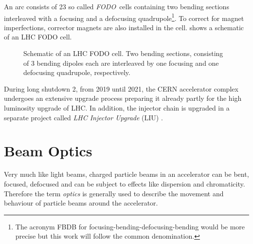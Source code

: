 An arc consists of 23 so called \emph{FODO}~cells containing two bending sections interleaved with
a focusing and a defocusing quadrupole\footnote{
    The acronym FBDB for focusing-bending-defocusing-bending would be more precise but this work will follow
    the common denomination.
}.
To correct for magnet imperfections, corrector magnets are also installed in the cell.
 shows a schematic of an LHC FODO cell.
%
\begin{figure}[h]
    \centering
     
    \caption{
        Schematic of an LHC FODO cell. Two bending sections, consisting of 3 bending dipoles each
        are interleaved by one focusing and one defocusing quadrupole, respectively.
    }
    \label{fig_fodo}
\end{figure}
%
During long shutdown 2, from 2019 until 2021, the CERN accelerator complex undergoes an extensive upgrade process 
preparing it already partly for the high luminosity upgrade of LHC.
In addition, the injector chain is upgraded in a separate project called \emph{LHC Injector Upgrade} (LIU) \cite{Hanke2017,Bartosik2017}.




\section{Beam Optics}

Very much like light beams, charged particle beams in an accelerator can be bent, focused, defocused
and can be subject to effects like dispersion and chromaticity. Therefore the term \emph{optics} is
generally used to describe the movement and behaviour of particle beams around the accelerator.

